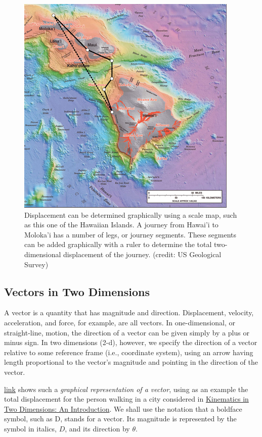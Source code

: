 \documentclass[
]{book}
\begin{document}
\begin{figure}
\hypertarget{import-auto-id1165296227310}{%
\centering
\includegraphics{images/Figure_03_02_00a.jpg}
\caption{Displacement can be determined graphically using a scale map, such as
this one of the Hawaiian Islands. A journey from Hawai'i to Moloka'i
has a number of legs, or journey segments. These segments can be added
graphically with a ruler to determine the total two-dimensional
displacement of the journey. (credit: US Geological
Survey)}\label{import-auto-id1165296227310}
}
\end{figure}

\hypertarget{fs-id1165296240221}{}
\hypertarget{vectors-in-two-dimensions}{%
\subsection{Vectors in Two Dimensions}\label{vectors-in-two-dimensions}}

A \protect\hypertarget{import-auto-id1165296389850}{}{vector} is a quantity
that has magnitude and direction. Displacement, velocity, acceleration,
and force, for example, are all vectors. In one-dimensional, or
straight-line, motion, the direction of a vector can be given simply by
a plus or minus sign. In two dimensions (2-d), however, we specify the
direction of a vector relative to some reference frame (i.e., coordinate
system), using an arrow having length proportional to the vector's
magnitude and pointing in the direction of the vector.

\protect\hyperlink{import-auto-id1165298666909}{link} shows such
a \emph{graphical representation of a vector}, using as an example the total
displacement for the person walking in a city considered in \href{/m54779}{Kinematics
in Two Dimensions: An Introduction}. We shall use the notation
that a boldface symbol, such as \(\text{D}{}\), stands for a vector. Its
magnitude is represented by the symbol in italics, \(D{}\), and its
direction by \(\theta{}\).
\end{document}
